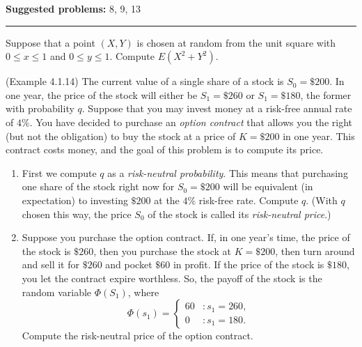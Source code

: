 \documentclass[12pt,reqno]{amsart}
\begin{document}
\textbf{Suggested problems:} 8, 9, 13

\bigskip
\hrule

\bigskip
\prob Suppose that a point $(X,Y)$ is chosen at random from the unit square with $0 \leq x \leq 1$ and $0 \leq y \leq 1$. Compute $E(X^2+Y^2)$.\vfill

\bigskip
\prob (Example 4.1.14) The current value of a single share of a stock is $S_0=\$200$. In one year, the price of the stock will either be $S_1=\$260$ or $S_1 = \$180$, the former with probability $q$. Suppose that you may invest money at a risk-free annual rate of $4\%$. You have decided to purchase an \textit{option contract} that allows you the right (but not the obligation) to buy the stock at a price of $K=\$200$ in one year. This contract costs money, and the goal of this problem is to compute its price.

\medskip
\begin{enumerate}
\item First we compute $q$ as a \textit{risk-neutral probability}. This means that purchasing one share of the stock right now for $S_0=\$200$ will be equivalent (in expectation) to investing $\$200$ at the $4\%$ risk-free rate. Compute $q$. (With $q$ chosen this way, the price $S_0$ of the stock is called its \textit{risk-neutral price}.)\vfill

\item Suppose you purchase the option contract. If, in one year's time, the price of the stock is $\$260$, then you purchase the stock at $K=\$200$, then turn around and sell it for $\$260$ and pocket $\$60$ in profit. If the price of the stock is $\$180$, you let the contract expire worthless. So, the payoff of the stock is the random variable $\Phi(S_1)$, where
\[
	\Phi(s_1) = \begin{cases}
	60 & : s_1 = 260, \\
	0 & : s_1 = 180.
	\end{cases}
\]
Compute the risk-neutral price of the option contract.\vfill
\end{enumerate}
\end{document}
